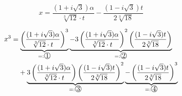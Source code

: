 
\[x = \frac{(1+i \sqrt{3})\alpha}{\sqrt[3]{12} \cdot t}
     -\frac{(1-i\sqrt{3}) t}{2\sqrt[3]{18}}\]

\begin{align}
    x^3 &= \underbrace{\left (\frac{(1+i\sqrt{3})\alpha}{\sqrt[3]{12} \cdot t} \right)^3}_{=: \raisebox{.5pt}{\textcircled{\raisebox{-.9pt} {1}}}}
           \underbrace{- 3 \left(\frac{(1+i\sqrt{3})\alpha}{\sqrt[3]{12} \cdot t} \right)^2 \left(\frac{(1-i\sqrt{3})t}{2 \sqrt[3]{18}} \right)}_{=: \raisebox{.5pt}{\textcircled{\raisebox{-.9pt} {2}}}}\\
         &\hphantom{{}=}+ \underbrace{3 \left(\frac{(1+i\sqrt{3})\alpha}{\sqrt[3]{12} \cdot t} \right) \left(\frac{(1-i\sqrt{3})t}{2 \sqrt[3]{18}}\right)^2}_{=: \raisebox{.5pt}{\textcircled{\raisebox{-.9pt} {3}}}}
           \underbrace{- \left(\frac{(1-i\sqrt{3})t}{2 \sqrt[3]{18}}\right)^3}_{=: \raisebox{.5pt}{\textcircled{\raisebox{-.9pt} {4}}}}
\end{align}

